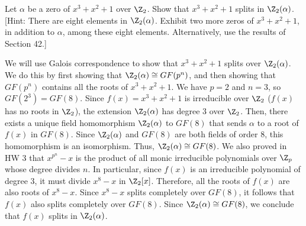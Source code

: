 \begin{problem}[44.10]
  Let $\alpha$ be a zero of $x^3 + x^2 + 1$ over $\Z_2$. Show that $x^3 + x^2 + 1$ splits in $\Z_2(\alpha)$. [Hint: There are eight elements in $\Z_2(\alpha)$. Exhibit two more zeros of $x^3 + x^2 + 1$, in addition to $\alpha$, among these eight elements. Alternatively, use the results of Section 42.]
\end{problem}

\begin{solution}
  We will use Galois correspondence to show that $x^3 + x^2 + 1$ splits over $\Z_2(\alpha)$. We do this by first showing that $\Z_2(\alpha) \cong GF(p^n)$, and then showing that $GF(p^n)$ contains all the roots of $x^3 + x^2 + 1$. We have $p = 2$ and $n = 3$, so $GF(2^3) = GF(8)$. Since $f(x) = x^3 + x^2 + 1$ is irreducible over $\Z_2$ ($f(x)$ has no roots in $\Z_2$), the extension $\Z_2(\alpha)$ has degree 3 over $\Z_2$. Then, there exists a unique field homomorphism $\Z_2(\alpha)$ to $GF(8)$ that sends $\alpha$ to a root of $f(x)$ in $GF(8)$. Since $\Z_2(\alpha)$ and $GF(8)$ are both fields of order 8, this homomorphism is an isomorphism. Thus, $\Z_2(\alpha) \cong GF(8)$. We also proved in HW 3 that $x^{p^n} - x$ is the product of all monic irreducible polynomials over $\Z_p$ whose degree divides $n$. In particular, since $f(x)$ is an irreducible polynomial of degree 3, it must divide $x^8 - x$ in $\Z_2[x]$. Therefore, all the roots of $f(x)$ are also roots of $x^8 - x$. Since $x^8 - x$ splits completely over $GF(8)$, it follows that $f(x)$ also splits completely over $GF(8)$. Since $\Z_2(\alpha) \cong GF(8)$, we conclude that $f(x)$ splits in $\Z_2(\alpha)$.
\end{solution}
